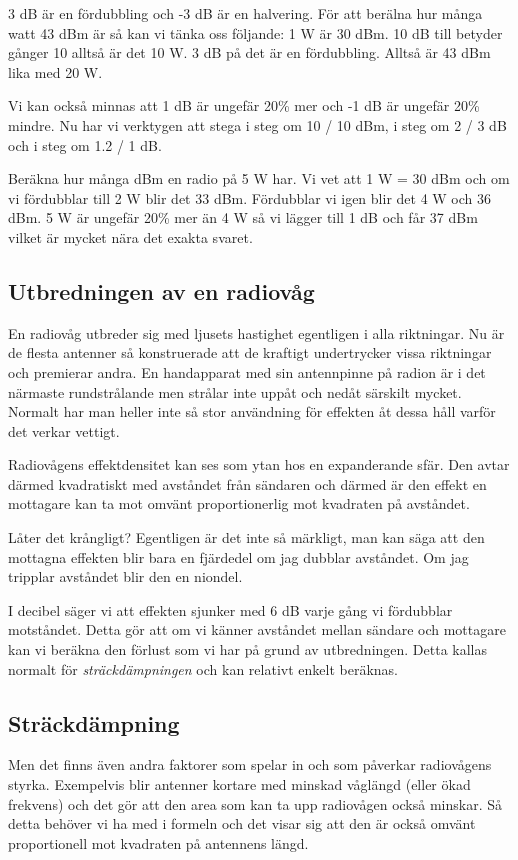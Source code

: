 \documentclass[12ypt,swedish,a4paper]{report}
\begin{document}
3 dB är en fördubbling och -3 dB är en halvering. För att berälna hur många watt 43 dBm är så kan vi tänka oss följande: 1 W är 30 dBm. 10 dB till betyder gånger 10 alltså är det 10 W. 3 dB på det är en fördubbling. Alltså är 43 dBm lika med 20 W. 

Vi kan också minnas att 1 dB är ungefär 20\% mer och -1 dB är ungefär 20\% mindre. Nu har vi verktygen att stega i steg om 10 / 10 dBm, i steg om 2 / 3 dB och i steg om 1.2 / 1 dB.

Beräkna hur många dBm en radio på 5 W har. Vi vet att 1 W = 30 dBm och om vi fördubblar till 2 W blir det 33 dBm. Fördubblar vi igen blir det 4 W och 36 dBm. 5 W är ungefär 20\% mer än 4 W så vi lägger till 1 dB och får 37 dBm vilket är mycket nära det exakta svaret.

\subsection{Utbredningen av en radiovåg}

En radiovåg utbreder sig med ljusets hastighet egentligen i alla riktningar. Nu är de flesta antenner så konstruerade att de kraftigt undertrycker vissa riktningar och premierar andra. En handapparat med sin antennpinne på radion är i det närmaste rundstrålande men strålar inte uppåt och nedåt särskilt mycket. Normalt har man heller inte så stor användning för effekten åt dessa håll varför det verkar vettigt.

Radiovågens effektdensitet kan ses som ytan hos en expanderande sfär. Den avtar därmed kvadratiskt med avståndet från sändaren och därmed är den effekt en mottagare kan ta mot omvänt proportionerlig mot kvadraten på avståndet.

Låter det krångligt? Egentligen är det inte så märkligt, man kan säga att den mottagna effekten blir bara en fjärdedel om jag dubblar avståndet. Om jag tripplar avståndet blir den en niondel.

I decibel säger vi att effekten sjunker med 6 dB varje gång vi fördubblar motståndet. Detta gör att om vi känner avståndet mellan sändare och mottagare kan vi beräkna den förlust som vi har på grund av utbredningen. Detta kallas normalt för \textit{sträckdämpningen} och kan relativt enkelt beräknas.

\subsection{Sträckdämpning}

Men det finns även andra faktorer som spelar in och som påverkar radiovågens styrka. Exempelvis blir antenner kortare med minskad våglängd (eller ökad frekvens) och det gör att den area som kan ta upp radiovågen också minskar. Så detta behöver vi ha med i formeln och det visar sig att den är också omvänt proportionell mot kvadraten på antennens längd.
\end{document}
